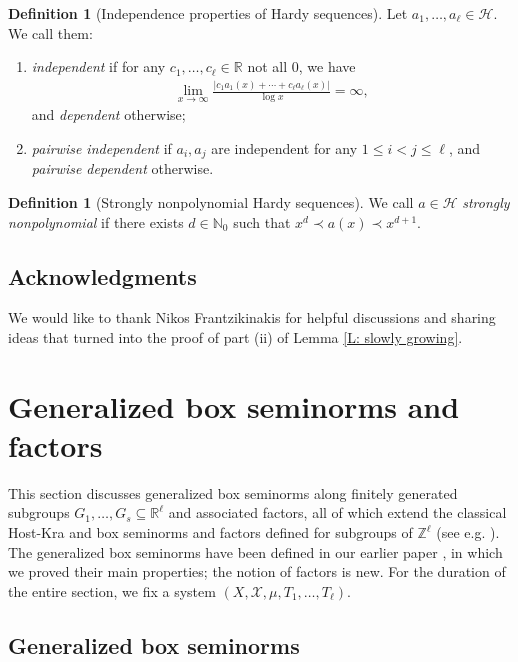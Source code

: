 \documentclass[11pt]{amsart}
\theoremstyle{definition}
\newtheorem{definition}[lemma]{Definition}
\newcommand{\N}{{\mathbb N}}
\newcommand{\R}{{\mathbb R}}
\newcommand{\Z}{{\mathbb Z}}
\newcommand{\CH}{{\mathcal H}}
\newcommand{\CX}{{\mathcal X}}
\newcommand{\1}{{\mathbf{1}}}
\begin{document}
\begin{definition}[Independence properties of Hardy sequences]\label{D: independence}
Let $a_1, \ldots, a_\ell\in\CH$. We call them:
\begin{enumerate}
\item \textit{independent} if for any $c_1, \ldots, c_\ell\in\R$ not all 0, we have
\begin{align*}
    \lim_{x\to\infty}\frac{|c_1 a_1(x) + \cdots + c_\ell a_\ell(x)|}{\log x}=\infty,
\end{align*}
and \textit{dependent} otherwise;
\item \textit{pairwise independent} if $a_i, a_j$ are independent for any $1\leq i<j\leq \ell$, and \textit{pairwise dependent} otherwise.
 \end{enumerate}
\end{definition}

\begin{definition}[Strongly nonpolynomial Hardy sequences]
    We call $a\in\CH$ \textit{strongly nonpolynomial} if     there exists $d\in\N_0$ such that $x^d\prec a(x)\prec x^{d+1}$.
\end{definition}

 \subsection*{Acknowledgments}
 We would like to thank Nikos Frantzikinakis for helpful discussions and sharing ideas that turned into the proof of part (ii) of Lemma \ref{L: slowly growing}.

\section{Generalized box seminorms and factors}

This section discusses generalized box seminorms along finitely generated subgroups $G_1, \ldots, G_s\subseteq\R^\ell$ and associated factors, all of which extend the classical Host-Kra and box seminorms and factors defined for subgroups of $\Z^\ell$ (see e.g. \cite{DFKS22, H09, HK05a, HK18, TZ16}). The generalized box seminorms have been defined in our earlier paper \cite{DKKST24}, in which we proved their main properties; the notion of factors is new. For the duration of the entire section, we fix a system $(X, \CX, \mu, T_1, \ldots, T_\ell)$.

\subsection{Generalized box seminorms}
\end{document}
